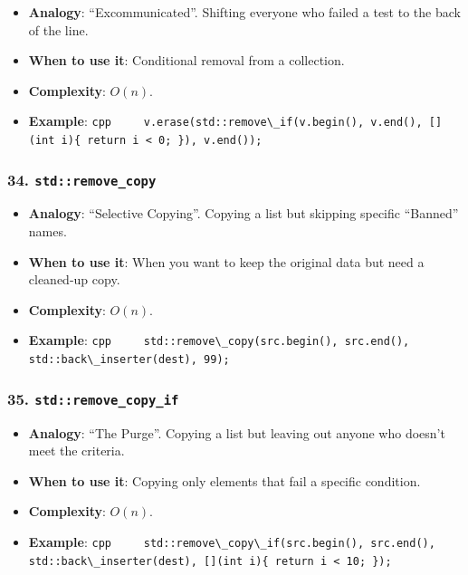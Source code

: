 \begin{itemize}
\tightlist
\item
  \textbf{Analogy}: ``Excommunicated''. Shifting everyone who failed a
  test to the back of the line.
\item
  \textbf{When to use it}: Conditional removal from a collection.
\item
  \textbf{Complexity}: \(O(n)\).
\item
  \textbf{Example}:
  \passthrough{\lstinline!cpp     v.erase(std::remove\_if(v.begin(), v.end(), [](int i)\{ return i < 0; \}), v.end());!}
\end{itemize}

\hypertarget{stdremove_copy}{%
\subsubsection{\texorpdfstring{34.
\texttt{std::remove\_copy}}{34. std::remove\_copy}}\label{stdremove_copy}}

\begin{itemize}
\tightlist
\item
  \textbf{Analogy}: ``Selective Copying''. Copying a list but skipping
  specific ``Banned'' names.
\item
  \textbf{When to use it}: When you want to keep the original data but
  need a cleaned-up copy.
\item
  \textbf{Complexity}: \(O(n)\).
\item
  \textbf{Example}:
  \passthrough{\lstinline!cpp     std::remove\_copy(src.begin(), src.end(), std::back\_inserter(dest), 99);!}
\end{itemize}

\hypertarget{stdremove_copy_if}{%
\subsubsection{\texorpdfstring{35.
\texttt{std::remove\_copy\_if}}{35. std::remove\_copy\_if}}\label{stdremove_copy_if}}

\begin{itemize}
\tightlist
\item
  \textbf{Analogy}: ``The Purge''. Copying a list but leaving out anyone
  who doesn't meet the criteria.
\item
  \textbf{When to use it}: Copying only elements that fail a specific
  condition.
\item
  \textbf{Complexity}: \(O(n)\).
\item
  \textbf{Example}:
  \passthrough{\lstinline!cpp     std::remove\_copy\_if(src.begin(), src.end(), std::back\_inserter(dest), [](int i)\{ return i < 10; \});!}
\end{itemize}

